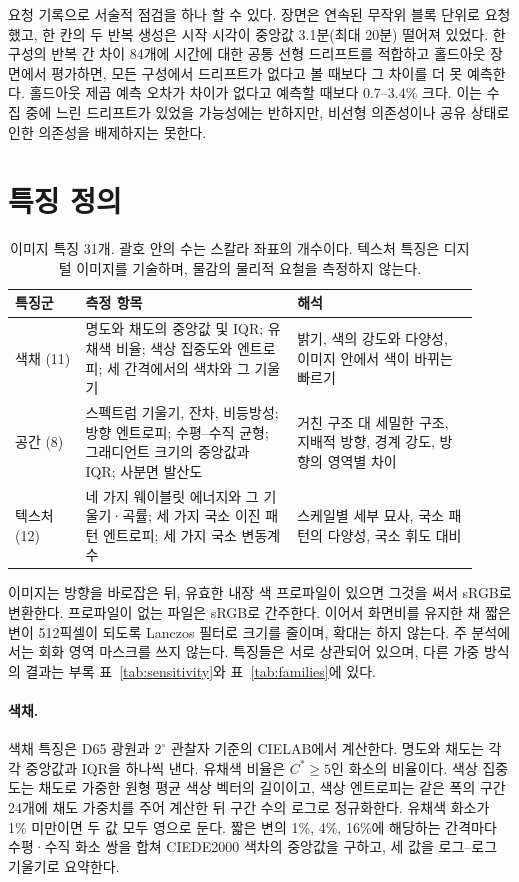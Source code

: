 요청 기록으로 서술적 점검을 하나 할 수 있다. 장면은 연속된 무작위 블록 단위로 요청했고, 한 칸의 두 반복
생성은 시작 시각이 중앙값 3.1분(최대 20분) 떨어져 있었다. 한 구성의 반복 간 차이 84개에 시간에 대한
공통 선형 드리프트를 적합하고 홀드아웃 장면에서 평가하면, 모든 구성에서 드리프트가 없다고 볼 때보다 그
차이를 더 못 예측한다. 홀드아웃 제곱 예측 오차가 차이가 없다고 예측할 때보다 0.7--3.4\% 크다. 이는 수집
중에 느린 드리프트가 있었을 가능성에는 반하지만, 비선형 의존성이나 공유 상태로 인한 의존성을 배제하지는
못한다.

\FloatBarrier
\section{특징 정의}\label{app:features}

\begin{table}[ht]
\caption{이미지 특징 31개. 괄호 안의 수는 스칼라 좌표의 개수이다. 텍스처 특징은 디지털 이미지를
기술하며, 물감의 물리적 요철을 측정하지 않는다.}
\label{tab:features}
\vspace{2pt}
\centering\small
\begin{tabular}{@{}p{0.14\linewidth}p{0.42\linewidth}p{0.36\linewidth}@{}}
\toprule
특징군 & 측정 항목 & 해석\\
\midrule
색채 (11) & 명도와 채도의 중앙값 및 IQR; 유채색 비율; 색상 집중도와 엔트로피; 세 간격에서의 색차와
그 기울기 & 밝기, 색의 강도와 다양성, 이미지 안에서 색이 바뀌는 빠르기\\[3pt]
공간 (8) & 스펙트럼 기울기, 잔차, 비등방성; 방향 엔트로피; 수평--수직 균형; 그래디언트 크기의 중앙값과
IQR; 사분면 발산도 & 거친 구조 대 세밀한 구조, 지배적 방향, 경계 강도, 방향의 영역별 차이\\[3pt]
텍스처 (12) & 네 가지 웨이블릿 에너지와 그 기울기·곡률; 세 가지 국소 이진 패턴 엔트로피; 세 가지 국소
변동계수 & 스케일별 세부 묘사, 국소 패턴의 다양성, 국소 휘도 대비\\
\bottomrule
\end{tabular}
\end{table}

이미지는 방향을 바로잡은 뒤, 유효한 내장 색 프로파일이 있으면 그것을 써서 sRGB로 변환한다. 프로파일이
없는 파일은 sRGB로 간주한다. 이어서 화면비를 유지한 채 짧은 변이 512픽셀이 되도록 Lanczos 필터로 크기를
줄이며, 확대는 하지 않는다. 주 분석에서는 회화 영역 마스크를 쓰지 않는다. 특징들은 서로 상관되어 있으며,
다른 가중 방식의 결과는 부록 표~\ref{tab:sensitivity}와 표~\ref{tab:families}에 있다.

\paragraph{색채.} 색채 특징은 D65 광원과 $2^\circ$ 관찰자 기준의 CIELAB에서 계산한다. 명도와 채도는
각각 중앙값과 IQR을 하나씩 낸다. 유채색 비율은 $C^*\ge5$인 화소의 비율이다. 색상 집중도는 채도로 가중한
원형 평균 색상 벡터의 길이이고, 색상 엔트로피는 같은 폭의 구간 24개에 채도 가중치를 주어 계산한 뒤 구간
수의 로그로 정규화한다. 유채색 화소가 1\% 미만이면 두 값 모두 영으로 둔다. 짧은 변의 1\%, 4\%, 16\%에
해당하는 간격마다 수평·수직 화소 쌍을 합쳐 CIEDE2000 색차\citep{sharma2005ciede}의 중앙값을 구하고,
세 값을 로그--로그 기울기로 요약한다.

